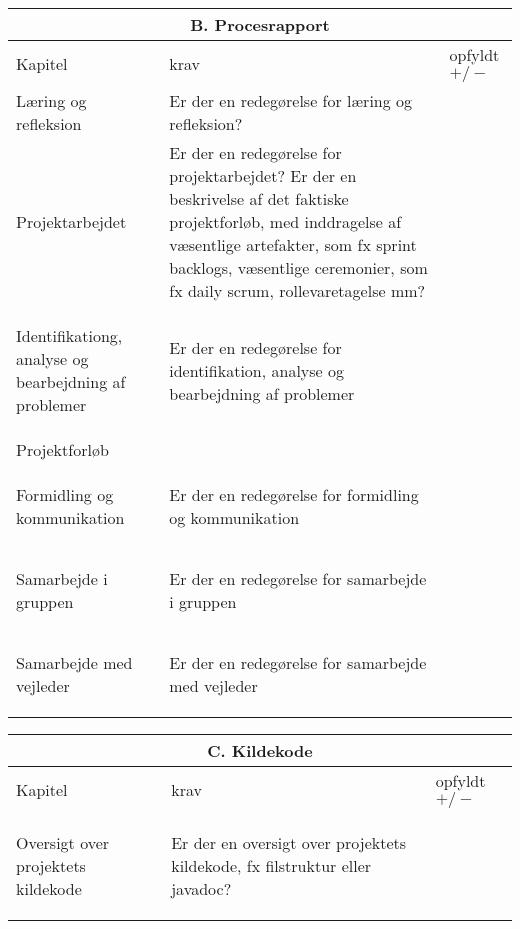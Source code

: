 \begin{center}
\begin{longtable}{|m{3.5cm}|m{10cm}|m{2.5cm}|}
\hline
\multicolumn{3}{|c|}{B. Procesrapport} \\
\hline
Kapitel & krav & opfyldt $+/-$ \\ \hline
Læring og refleksion & Er der en redegørelse for læring og refleksion? & \\ \hline
Projektarbejdet & Er der en redegørelse for projektarbejdet? Er der en beskrivelse af det faktiske projektforløb, med inddragelse af væsentlige artefakter, som fx sprint backlogs, væsentlige ceremonier, som fx  daily scrum, rollevaretagelse mm? & \\ 
\hline
\begin{flushleft} 
Identifikationg, analyse og bearbejdning af problemer
\end{flushleft}
& Er der en redegørelse for identifikation, analyse og bearbejdning af problemer & \\ 
\hline
Projektforløb & & \\ \hline
\begin{flushleft} 
Formidling og kommunikation
\end{flushleft}
& Er der en redegørelse for formidling og kommunikation & \\ 
\hline
\begin{flushleft} 
Samarbejde i gruppen 
\end{flushleft}
& Er der en redegørelse for samarbejde i gruppen & \\ \hline
\begin{flushleft} 
Samarbejde med vejleder
\end{flushleft}
& Er der en redegørelse for samarbejde med vejleder & \\ \hline

\end{longtable}
\end{center}

\begin{center}
\begin{longtable}{|m{3.5cm}|m{10cm}|m{2.5cm}|}
\hline
\multicolumn{3}{|c|}{C. Kildekode} \\ \hline
Kapitel & krav & opfyldt $+/-$ \\ \hline
\begin{flushleft} 
Oversigt over projektets kildekode
\end{flushleft} 
& Er der en oversigt over projektets kildekode, fx filstruktur eller javadoc? & \\ \hline
\end{longtable}
\end{center}

